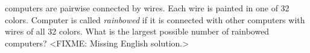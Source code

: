  computers are pairwise connected by wires.
Each wire is painted in one of 32 colors.
Computer is called \emph{rainbowed} if it is connected with other computers
with wires of all 32 colors.
What is the largest possible number of rainbowed computers?
\solution
<FIXME: Missing English solution.>
\endproblem
